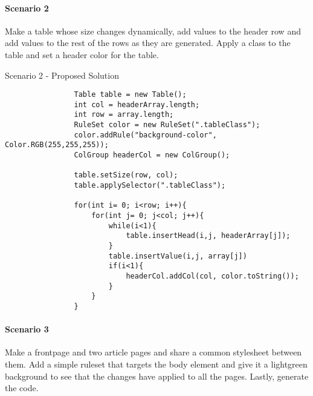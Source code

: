 \documentclass[12pt]{article}
\begin{document}
        \paragraph{Scenario 2}
        Make a table whose size changes dynamically, add values to the header row and add values to the rest of the rows as they are generated. Apply a class to the table and set a header color for the table.

        \begin{shaded}
            Scenario 2 - Proposed Solution
            \begin{lstlisting}
                Table table = new Table();
                int col = headerArray.length;
                int row = array.length;
                RuleSet color = new RuleSet(".tableClass");
                color.addRule("background-color", Color.RGB(255,255,255));
                ColGroup headerCol = new ColGroup();

                table.setSize(row, col);
                table.applySelector(".tableClass");

                for(int i= 0; i<row; i++){
                    for(int j= 0; j<col; j++){
                        while(i<1){
                            table.insertHead(i,j, headerArray[j]);
                        }
                        table.insertValue(i,j, array[j])
                        if(i<1){
                            headerCol.addCol(col, color.toString());
                        }
                    }
                }
            \end{lstlisting}
        \end{shaded}

        \paragraph{Scenario 3}
        Make a frontpage and two article pages and share a common stylesheet between them. Add a simple ruleset that targets the body element and give it a lightgreen background to see that the changes have applied to all the pages. Lastly, generate the code.
\end{document}
